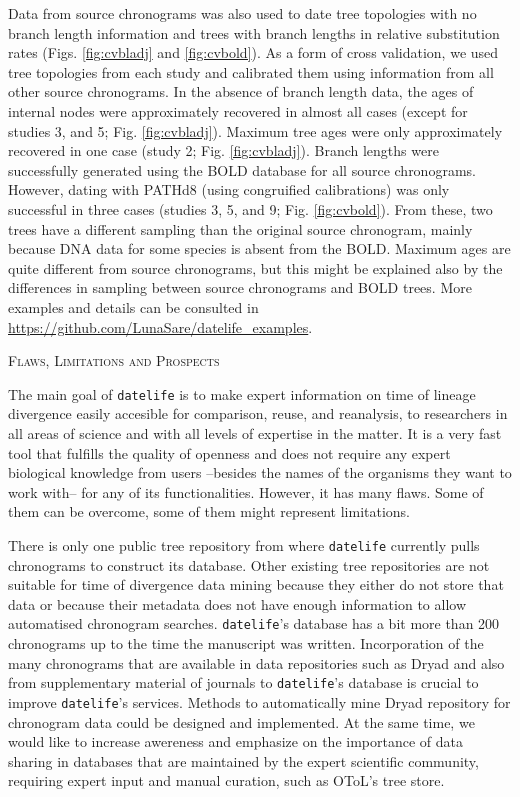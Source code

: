 \documentclass[]{article}
\begin{document}
Data from source chronograms was also used to date tree topologies with no branch length information and trees with branch lengths in relative substitution rates (Figs. \ref{fig:cvbladj} and \ref{fig:cvbold}). As a form of cross validation, we used tree topologies from each study and calibrated them using information from all other source chronograms. In the absence of branch length data, the ages of internal nodes were approximately recovered in almost all cases (except for studies 3, and 5; Fig. \ref{fig:cvbladj}). Maximum tree ages were only approximately recovered in one case (study 2; Fig. \ref{fig:cvbladj}).
Branch lengths were successfully generated using the BOLD database for all source chronograms. However, dating with PATHd8 (using congruified calibrations) was only successful in
three cases (studies 3, 5, and 9; Fig. \ref{fig:cvbold}). From these, two trees have a different sampling than the original source chronogram, mainly because DNA data for some species is absent from the BOLD. Maximum ages are quite different from source chronograms, but this might be explained also by the differences in sampling between source chronograms and BOLD trees.
More examples and details can be consulted in \url{https://github.com/LunaSare/datelife_examples}.

\begin{center}
\textsc{Flaws, Limitations and Prospects}
\end{center}

The main goal of \texttt{datelife} is to make expert information on time of lineage divergence easily accesible for comparison, reuse, and reanalysis, to researchers in all areas of science and with all levels of expertise in the matter. It is a very fast tool that fulfills the quality of openness and does not require any expert biological knowledge from users --besides the names of the organisms they want to work with-- for any of its functionalities. However, it has many flaws. Some of them can be overcome, some of them might represent limitations.

There is only one public tree repository from where \texttt{datelife} currently pulls chronograms to construct its database. Other existing tree repositories are not suitable for time of divergence data mining because they either do not store that data or because their metadata does not have enough information to allow automatised chronogram searches. \texttt{datelife}'s database has a bit more than 200 chronograms up to the time the manuscript was written.
Incorporation of the many chronograms that are available in data repositories such as Dryad and also from supplementary material of journals to \texttt{datelife}'s database is crucial to improve \texttt{datelife}'s services.
Methods to automatically mine Dryad repository for chronogram data could be designed and implemented.
At the same time, we would like to increase awereness and emphasize on the importance of data sharing in databases that are maintained by the expert scientific community, requiring expert input and manual curation, such as OToL's tree store.
\end{document}
